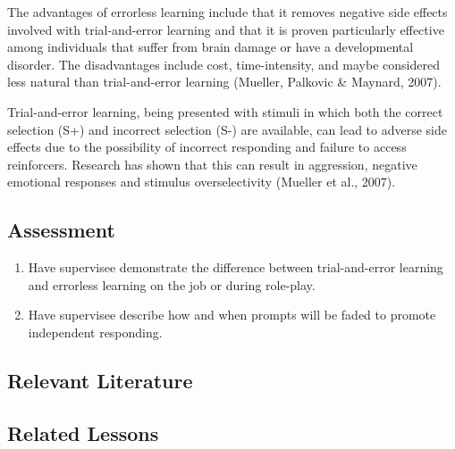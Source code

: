 The advantages of errorless learning include that it removes negative side effects involved with trial-and-error learning and that it is proven particularly effective among individuals that suffer from brain damage or have a developmental disorder. The disadvantages include cost, time-intensity, and maybe considered less natural than trial-and-error learning (Mueller, Palkovic \& Maynard, 2007).

Trial-and-error learning, being presented with stimuli in which both the correct selection (S+) and incorrect selection (S-) are available, can lead to adverse side effects due to the possibility of incorrect responding and failure to access reinforcers. Research has shown that this can result in aggression, negative emotional responses and stimulus overselectivity (Mueller et al., 2007).
%
\subsection{Assessment}
\begin{enumerate}
\item Have supervisee demonstrate the difference between trial-and-error learning and errorless learning on the job or during role-play.
\item Have supervisee describe how and when prompts will be faded to promote independent responding. 
%
\end{enumerate}
%
\subsection{Relevant Literature}
\begin{refsection}
\nocite{fillingham2003application,
        mueller2007errorless,
        terrace1963errorless}
\printbibliography[heading=none]
\end{refsection}
%
\subsection{Related Lessons} 
\fourdThree{}\\
\fourdFour{}\\
\fourFKTwentyFour{}\\

